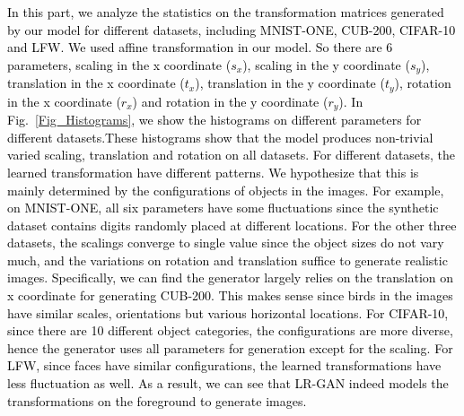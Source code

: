 \documentclass{article} \usepackage{iclr2017_conference,times}
\begin{document}
\textcolor{black}{In this part, we analyze the statistics on the transformation matrices generated by our model for different datasets, including MNIST-ONE, CUB-200, CIFAR-10 and LFW. We used affine transformation in our model. So there are 6 parameters, scaling in the x coordinate ($s_x$), scaling in the y coordinate ($s_y$), translation in the x coordinate ($t_x$), translation in the y coordinate ($t_y$), rotation in the x coordinate ($r_x$) and rotation in the y coordinate ($r_y$). In Fig.~\ref{Fig_Histograms}, we show the histograms on different parameters for different datasets.These histograms show that the model produces non-trivial varied scaling, translation and rotation on all datasets. For different datasets, the learned transformation have different patterns. We hypothesize that this is mainly determined by the configurations of objects in the images. For example, on MNIST-ONE, all six parameters have some fluctuations since the synthetic dataset contains digits randomly placed at different locations. For the other three datasets, the scalings converge to single value since the object sizes do not vary much, and the variations on rotation and translation suffice to generate realistic images. Specifically, we can find the generator largely relies on the translation on x coordinate for generating CUB-200. This makes sense since birds in the images have similar scales, orientations but various horizontal locations. For CIFAR-10, since there are 10 different object categories, the configurations are more diverse, hence the generator uses all parameters for generation except for the scaling.  For LFW, since faces have similar configurations, the learned transformations have less fluctuation as well. As a result, we can see that LR-GAN indeed models the transformations on the foreground to generate images.}
\end{document}

